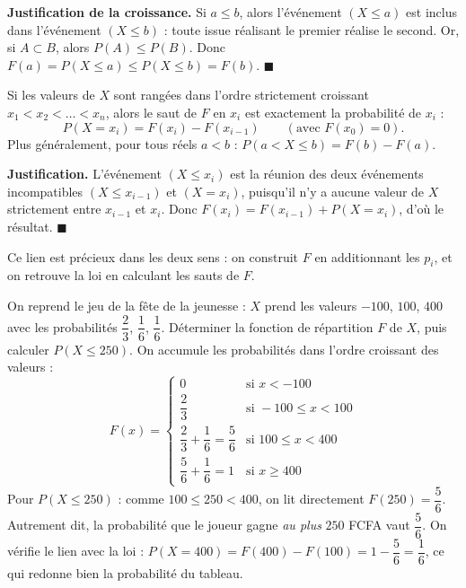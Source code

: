 \documentclass[11pt]{article}
\begin{document}
\textbf{Justification de la croissance.} Si $a \leq b$, alors l'événement $(X \leq a)$ est inclus dans l'événement $(X \leq b)$ : toute issue réalisant le premier réalise le second. Or, si $A \subset B$, alors $P(A) \leq P(B)$. Donc $F(a) = P(X \leq a) \leq P(X \leq b) = F(b)$. $\blacksquare$

\begin{propriete}
Si les valeurs de $X$ sont rangées dans l'ordre strictement croissant $x_1 < x_2 < \dots < x_n$, alors le saut de $F$ en $x_i$ est exactement la probabilité de $x_i$ :
\[ P(X = x_i) = F(x_i) - F(x_{i-1}) \qquad (\text{avec } F(x_0) = 0). \]
Plus généralement, pour tous réels $a < b$ : $P(a < X \leq b) = F(b) - F(a)$.
\end{propriete}

\textbf{Justification.} L'événement $(X \leq x_i)$ est la réunion des deux événements incompatibles $(X \leq x_{i-1})$ et $(X = x_i)$, puisqu'il n'y a aucune valeur de $X$ strictement entre $x_{i-1}$ et $x_i$. Donc $F(x_i) = F(x_{i-1}) + P(X = x_i)$, d'où le résultat. $\blacksquare$

Ce lien est précieux dans les deux sens : on construit $F$ en additionnant les $p_i$, et on retrouve la loi en calculant les sauts de $F$.

\begin{exoresolu}
On reprend le jeu de la fête de la jeunesse : $X$ prend les valeurs $-100$, $100$, $400$ avec les probabilités $\dfrac{2}{3}$, $\dfrac{1}{6}$, $\dfrac{1}{6}$. Déterminer la fonction de répartition $F$ de $X$, puis calculer $P(X \leq 250)$.
\tcblower
On accumule les probabilités dans l'ordre croissant des valeurs :
\[ F(x) = \begin{cases}
0 & \text{si } x < -100 \\[6pt]
\dfrac{2}{3} & \text{si } -100 \leq x < 100 \\[6pt]
\dfrac{2}{3} + \dfrac{1}{6} = \dfrac{5}{6} & \text{si } 100 \leq x < 400 \\[6pt]
\dfrac{5}{6} + \dfrac{1}{6} = 1 & \text{si } x \geq 400
\end{cases} \]
Pour $P(X \leq 250)$ : comme $100 \leq 250 < 400$, on lit directement $F(250) = \dfrac{5}{6}$. Autrement dit, la probabilité que le joueur gagne \emph{au plus} $250$ FCFA vaut $\dfrac{5}{6}$. On vérifie le lien avec la loi : $P(X = 400) = F(400) - F(100) = 1 - \dfrac{5}{6} = \dfrac{1}{6}$, ce qui redonne bien la probabilité du tableau.
\end{exoresolu}
\end{document}
